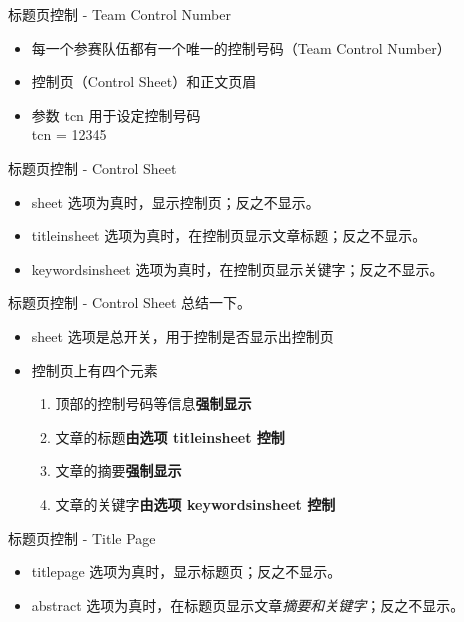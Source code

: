 \documentclass{beamer}
\begin{document}
\begin{frame}{标题页控制 - Team Control Number}
  \begin{itemize}
    \item 每一个参赛队伍都有一个唯一的控制号码（Team Control Number）
    \item 控制页（Control Sheet）和正文页眉\pause
    \item 参数 tcn 用于设定控制号码\\
      tcn = 12345
  \end{itemize}
\end{frame}

\begin{frame}{标题页控制 - Control Sheet}
  \begin{itemize}
    \item sheet 选项为真时，显示控制页；反之不显示。\pause
    \item titleinsheet 选项为真时，在控制页显示文章标题；反之不显示。
    \item keywordsinsheet 选项为真时，在控制页显示关键字；反之不显示。
  \end{itemize}
\end{frame}

\begin{frame}{标题页控制 - Control Sheet}
  总结一下。
  \begin{itemize}
    \item sheet 选项是总开关，用于控制是否显示出控制页\pause
    \item 控制页上有四个元素\pause
      \begin{enumerate}
        \item 顶部的控制号码等信息\textbf{强制显示}\pause
        \item 文章的标题\textbf{由选项 titleinsheet 控制}\pause
        \item 文章的摘要\textbf{强制显示}\pause
        \item 文章的关键字\textbf{由选项 keywordsinsheet 控制}
      \end{enumerate}
  \end{itemize}
\end{frame}

\begin{frame}{标题页控制 - Title Page}
  \begin{itemize}
    \item titlepage 选项为真时，显示标题页；反之不显示。\pause
    \item abstract 选项为真时，在标题页显示文章\emph{摘要和关键字}；反之不显示。
  \end{itemize}
\end{frame}
\end{document}
